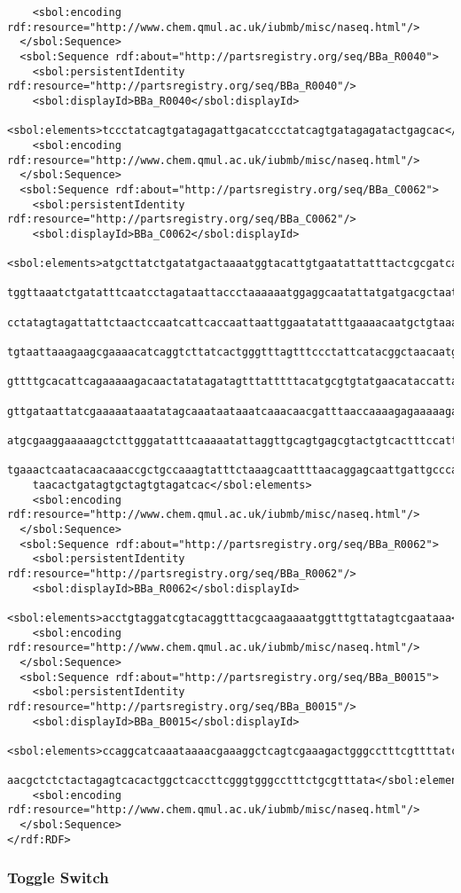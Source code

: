 \begin{lstlisting}
    <sbol:encoding rdf:resource="http://www.chem.qmul.ac.uk/iubmb/misc/naseq.html"/>
  </sbol:Sequence>
  <sbol:Sequence rdf:about="http://partsregistry.org/seq/BBa_R0040">
    <sbol:persistentIdentity rdf:resource="http://partsregistry.org/seq/BBa_R0040"/>
    <sbol:displayId>BBa_R0040</sbol:displayId>
    <sbol:elements>tccctatcagtgatagagattgacatccctatcagtgatagagatactgagcac</sbol:elements>
    <sbol:encoding rdf:resource="http://www.chem.qmul.ac.uk/iubmb/misc/naseq.html"/>
  </sbol:Sequence>
  <sbol:Sequence rdf:about="http://partsregistry.org/seq/BBa_C0062">
    <sbol:persistentIdentity rdf:resource="http://partsregistry.org/seq/BBa_C0062"/>
    <sbol:displayId>BBa_C0062</sbol:displayId>
    <sbol:elements>atgcttatctgatatgactaaaatggtacattgtgaatattatttactcgcgatcatttatcctcattcta
    tggttaaatctgatatttcaatcctagataattaccctaaaaaatggaggcaatattatgatgacgctaatttaataaaatatgat
    cctatagtagattattctaactccaatcattcaccaattaattggaatatatttgaaaacaatgctgtaaataaaaaatctccaaa
    tgtaattaaagaagcgaaaacatcaggtcttatcactgggtttagtttccctattcatacggctaacaatggcttcggaatgctta
    gttttgcacattcagaaaaagacaactatatagatagtttatttttacatgcgtgtatgaacataccattaattgttccttctcta
    gttgataattatcgaaaaataaatatagcaaataataaatcaaacaacgatttaaccaaaagagaaaaagaatgtttagcgtgggc
    atgcgaaggaaaaagctcttgggatatttcaaaaatattaggttgcagtgagcgtactgtcactttccatttaaccaatgcgcaaa
    tgaaactcaatacaacaaaccgctgccaaagtatttctaaagcaattttaacaggagcaattgattgcccatactttaaaaattaa
    taacactgatagtgctagtgtagatcac</sbol:elements>
    <sbol:encoding rdf:resource="http://www.chem.qmul.ac.uk/iubmb/misc/naseq.html"/>
  </sbol:Sequence>
  <sbol:Sequence rdf:about="http://partsregistry.org/seq/BBa_R0062">
    <sbol:persistentIdentity rdf:resource="http://partsregistry.org/seq/BBa_R0062"/>
    <sbol:displayId>BBa_R0062</sbol:displayId>
    <sbol:elements>acctgtaggatcgtacaggtttacgcaagaaaatggtttgttatagtcgaataaa</sbol:elements>
    <sbol:encoding rdf:resource="http://www.chem.qmul.ac.uk/iubmb/misc/naseq.html"/>
  </sbol:Sequence>
  <sbol:Sequence rdf:about="http://partsregistry.org/seq/BBa_B0015">
    <sbol:persistentIdentity rdf:resource="http://partsregistry.org/seq/BBa_B0015"/>
    <sbol:displayId>BBa_B0015</sbol:displayId>
    <sbol:elements>ccaggcatcaaataaaacgaaaggctcagtcgaaagactgggcctttcgttttatctgttgtttgtcggtg
    aacgctctctactagagtcacactggctcaccttcgggtgggcctttctgcgtttata</sbol:elements>
    <sbol:encoding rdf:resource="http://www.chem.qmul.ac.uk/iubmb/misc/naseq.html"/>
  </sbol:Sequence>
</rdf:RDF>
\end{lstlisting}

\subsubsection{Toggle Switch}

